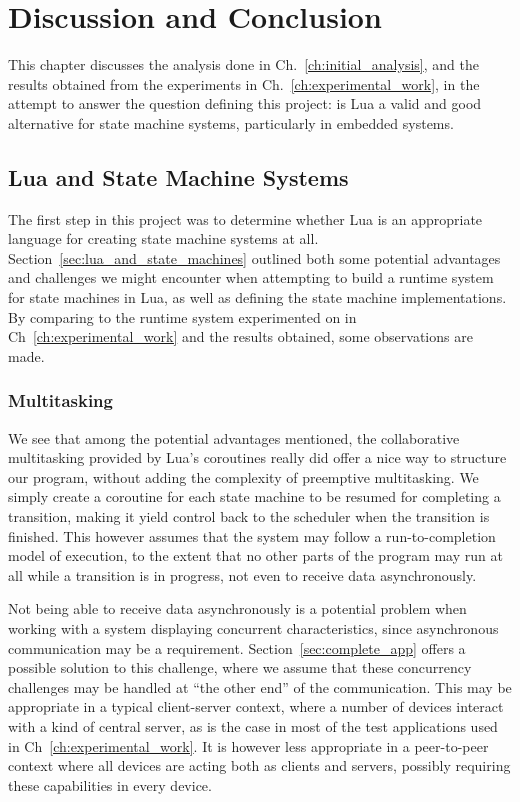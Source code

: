 \chapter{Discussion and Conclusion}
\label{ch:discussion_conclusion}
This chapter discusses the analysis done in Ch.~\ref{ch:initial_analysis}, and the results obtained from the experiments in Ch.~\ref{ch:experimental_work}, in the attempt to answer the question defining this project: is Lua a valid and good alternative for state machine systems, particularly in embedded systems.

\section{Lua and State Machine Systems}
\label{sec:disq_lua_stm}
The first step in this project was to determine whether Lua is an appropriate language for creating state machine systems at all. Section~\ref{sec:lua_and_state_machines} outlined both some potential advantages and challenges we might encounter when attempting to build a runtime system for state machines in Lua, as well as defining the state machine implementations. By comparing to the runtime system experimented on in Ch~\ref{ch:experimental_work} and the results obtained, some observations are made.

\subsection{Multitasking}
\label{sec:disq_multitasking}
We see that among the potential advantages mentioned, the collaborative multitasking provided by Lua's coroutines really did offer a nice way to structure our program, without adding the complexity of preemptive multitasking. We simply create a coroutine for each state machine to be resumed for completing a transition, making it yield control back to the scheduler when the transition is finished. This however assumes that the system may follow a run-to-completion model of execution, to the extent that no other parts of the program may run at all while a transition is in progress, not even to receive data asynchronously.

\noindent
Not being able to receive data asynchronously is a potential problem when working with a system displaying concurrent characteristics, since asynchronous communication may be a requirement. Section~\ref{sec:complete_app} offers a possible solution to this challenge, where we assume that these concurrency challenges may be handled at ``the other end'' of the communication. This may be appropriate in a typical client-server context, where a number of devices interact with a kind of central server, as is the case in most of the test applications used in Ch~\ref{ch:experimental_work}. It is however less appropriate in a peer-to-peer context where all devices are acting both as clients and servers, possibly requiring these capabilities in every device.

